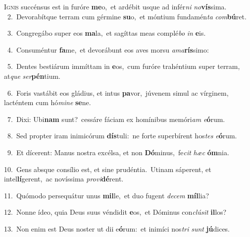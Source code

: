 \lettrine{\initial\textcolor{\initialcolor}{I}}{gnis} succénsus est in furóre \textbf{me}\-o,~\star et ardébit usque ad infér\textit{ni} \textit{no}\-\textbf{vís}sima.\\
{\numbfont\textcolor{\numbcolor}{~2.}}~Devorabítque terram cum gérmine \textbf{su}\-o,~\star et móntium fundamén\textit{ta} \textit{com}\-\textbf{bú}ret.\par
{\numbfont\textcolor{\numbcolor}{~3.}}~Congregábo super eos \textbf{ma}\-la,~\star et sagíttas meas complé\textit{bo} \textit{in} \textbf{e}\-is.\par
{\numbfont\textcolor{\numbcolor}{~4.}}~Consuméntur \textbf{fa}\-me,~\star et devorábunt eos aves morsu \textit{a}\-\textit{ma}\textbf{rís}simo:\par
{\numbfont\textcolor{\numbcolor}{~5.}}~Dentes bestiárum immíttam in \textbf{e}\-os,~\star cum furóre trahéntium super terram, at\textit{que} \textit{ser}\-\textbf{pén}tium.\par
{\numbfont\textcolor{\numbcolor}{~6.}}~Foris vastábit eos gládius, et intus \textbf{pa}\-vor,~\star júvenem simul ac vírginem, lacténtem cum hó\-\textit{mi}\-\textit{ne} \textbf{se}\-ne.\par
{\numbfont\textcolor{\numbcolor}{~7.}}~Dixi: Ubi\textbf{nam} sunt?~\star cessáre fáciam ex homínibus memóri\textit{am} \textit{e}\-\textbf{ó}rum.\par
{\numbfont\textcolor{\numbcolor}{~8.}}~Sed propter iram inimicórum \textbf{dís}\-tuli:~\star ne forte superbírent hos\textit{tes} \textit{e}\-\textbf{ó}rum.\par
{\numbfont\textcolor{\numbcolor}{~9.}}~Et dícerent: Manus nostra excélsa, et non \textbf{Dó}\-minus,~\star fe\textit{cit} \textit{hæc} \textbf{óm}\-nia.\par
{\numbfont\textcolor{\numbcolor}{10.}}~Gens absque consílio est, et sine prudéntia.~\dagger Utinam sáperent, et intel\-\textbf{lí}\-gerent,~\star ac novíssima \textit{pro}\-\textit{vi}\textbf{dé}rent.\par
{\numbfont\textcolor{\numbcolor}{11.}}~Quómodo persequátur unus \textbf{mil}\-le,~\star et duo fugent \textit{de}\-\textit{cem} \textbf{míl}\-lia?\par
{\numbfont\textcolor{\numbcolor}{12.}}~Nonne ídeo, quia Deus suus véndidit \textbf{e}\-os,~\star et Dóminus con\-\textit{clú}\-\textit{sit} \textbf{il}\-los?\par
{\numbfont\textcolor{\numbcolor}{13.}}~Non enim est Deus noster ut dii e\-\textbf{ó}\-rum:~\star et inimíci nos\textit{tri} \textit{sunt} \textbf{jú}\-dices.\par

